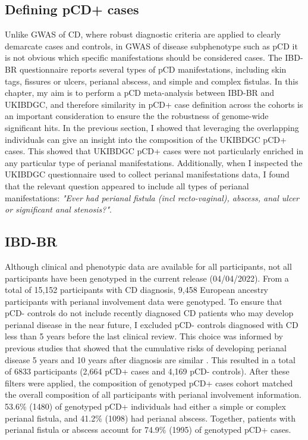   \subsection{Defining pCD+ cases}
  Unlike GWAS of CD, where robust diagnostic criteria are applied to clearly demarcate cases and controls, in GWAS of disease subphenotype such as pCD it is not obvious which specific manifestations should be considered cases. The IBD-BR questionnaire reports several types of pCD manifestations, including skin tags, fissures or ulcers, perianal abscess, and simple and complex fistulas. In this chapter, my aim is to perform a pCD meta-analysis between IBD-BR and UKIBDGC, and therefore similarity in pCD+ case definition across the cohorts is an important consideration to ensure the the robustness of genome-wide significant hits. In the previous section, I showed that leveraging the overlapping individuals can give an insight into the composition of the UKIBDGC pCD+ cases. This showed that UKIBDGC pCD+ cases were not particularly enriched in any particular type of perianal manifestations. Additionally, when I inspected the UKIBDGC questionnaire used to collect perianal manifestations data, I found that the relevant question appeared to include all types of perianal manifestations: \textit{"Ever had perianal fistula (incl recto-vaginal),  abscess, anal ulcer or significant anal stenosis?"}.
  
 
\subsection{IBD-BR}
Although clinical and phenotypic data are available for all participants, not all participants have been genotyped in the current release (04/04/2022). From a total of 15,152 participants with CD diagnosis, 9,458 European ancestry participants with perianal involvement data were genotyped. To ensure that pCD- controls do not include recently diagnosed CD patients who may develop perianal disease in the near future, I excluded pCD- controls diagnosed with CD less than 5 years before the last clinical review. This choice was informed by previous studies that showed that the cumulative risks of developing perianal disease 5 years and 10 years after diagnosis are similar \cite{Tsai2022-kz}. This resulted in a total of 6833 participants (2,664 pCD+ cases and 4,169 pCD- controls). After these filters were applied, the composition of genotyped pCD+ cases cohort matched the overall composition of all participants with perianal involvement information. 53.6\% (1480) of genotyped pCD+ individuals had either a simple or complex perianal fistula, and 41.2\% (1098) had perianal abscess. Together, patients with perianal fistula or abscess account for 74.9\% (1995) of genotyped pCD+ cases.\\

